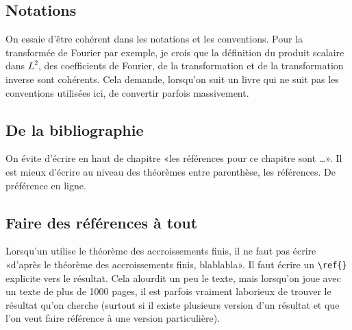 \documentclass[a4paper,12pt]{article}
\begin{document}
\subsection{Notations}

On essaie d'être cohérent dans les notations et les conventions. Pour la transformée de Fourier par exemple, je crois que la définition du produit scalaire dans \( L^2\), des coefficients de Fourier, de la transformation et de la transformation inverse sont cohérents. Cela demande, lorsqu'on suit un livre qui ne suit pas les conventions utilisées ici, de convertir parfois massivement.

\subsection{De la bibliographie}

On évite d'écrire en haut de chapitre «les références pour ce chapitre sont \ldots». Il est mieux d'écrire au niveau des théorèmes entre parenthèse, les références. De préférence en ligne.

\subsection{Faire des références à tout}

Lorsqu'un utilise le théorème des accroissements finis, il ne faut pas écrire «d'après le théorème des accroissements finis, blablabla». Il faut écrire un \verb+\ref{}+ explicite vers le résultat. Cela alourdit un peu le texte, mais lorsqu'on joue avec un texte de plus de 1000 pages, il est parfois vraiment laborieux de trouver le résultat qu'on cherche (surtout si il existe plusieurs version d'un résultat et que l'on veut faire référence à une version particulière).
\end{document}
